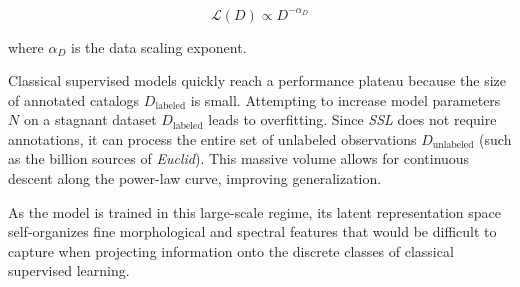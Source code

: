\begin{equation}
  \mathcal{L}\left(D\right) \propto D^{-\alpha_D}
  \label{eq:ley_escala_datos}
\end{equation}

where $\alpha_D$ is the data scaling exponent.

Classical supervised models quickly reach a performance plateau because the size of annotated catalogs $D_{\text{labeled}}$ is small. Attempting to increase model parameters $N$ on a stagnant dataset $D_{\text{labeled}}$ leads to overfitting. Since \textit{\gls{SSL}} does not require annotations, it can process the entire set of unlabeled observations $D_{\text{unlabeled}}$ (such as the billion sources of \textit{Euclid}). This massive volume allows for continuous descent along the power-law curve, improving generalization.

As the model is trained in this large-scale regime, its latent representation space self-organizes fine morphological and spectral features that would be difficult to capture when projecting information onto the discrete classes of classical supervised learning.
